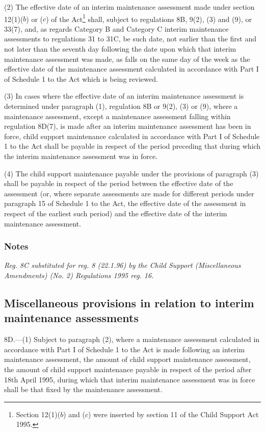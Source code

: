 \documentclass[a4paper]{article}
\newcommand\amendment[1]{\subsubsection*{Notes}{\itshape\frenchspacing\footnotesize #1 \par}}
\begin{document}
(2) The effective date of an interim maintenance assessment made under section 12(1)($b$) or ($c$) of the Act\footnote{\frenchspacing Section 12(1)($b$) and ($c$) were inserted by section 11 of the Child Support Act 1995.} shall, subject to regulations 8B, 9(2), (3) and (9), or 33(7), and, as regards Category B and Category C interim maintenance assessments to regulations 31 to 31C, be such date, not earlier than the first and not later than the seventh day following the date upon which that interim maintenance assessment was made, as falls on the same day of the week as the effective date of the maintenance assessment calculated in accordance with Part I of Schedule 1 to the Act which is being reviewed.

(3) In cases where the effective date of an interim maintenance assessment is determined under paragraph (1), regulation 8B or 9(2), (3) or (9), where a maintenance assessment, except a maintenance assessment falling within regulation 8D(7), is made after an interim maintenance assessment has been in force, child support maintenance calculated in accordance with Part I of Schedule 1 to the Act shall be payable in respect of the period preceding that during which the interim maintenance assessment was in force.

(4) The child support maintenance payable under the provisions of paragraph (3) shall be payable in respect of the period between the effective date of the assessment (or, where separate assessments are made for different periods under paragraph 15 of Schedule 1 to the Act, the effective date of the assessment in respect of the earliest such period) and the effective date of the interim maintenance assessment.

\amendment{
Reg. 8C substituted for reg. 8 (22.1.96) by the Child Support (Miscellaneous Amendments) (No. 2) Regulations 1995 reg. 16.
}

\subsection[8D. Miscellaneous provisions in relation to interim maintenance assessments]{Miscellaneous provisions in relation to interim maintenance assessments}

8D.—(1) Subject to paragraph (2), where a maintenance assessment calculated in accordance with Part I of Schedule 1 to the Act is made following an interim maintenance assessment, the amount of child support maintenance assessment, the amount of child support maintenance payable in respect of the period after 18th April 1995, during which that interim maintenance assessment was in force shall be that fixed by the maintenance assessment.
\end{document}
